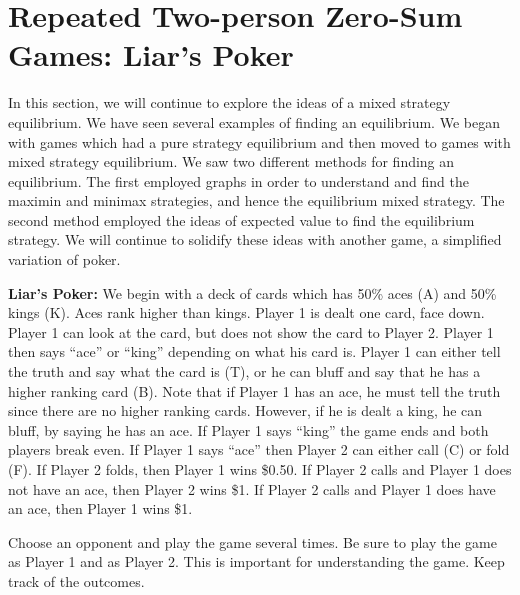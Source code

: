 

\section{Repeated Two-person Zero-Sum Games: Liar's Poker}




In this section, we will continue to explore the ideas of a mixed strategy equilibrium. We have seen several examples of finding an equilibrium. We began with games which had a pure strategy equilibrium and then moved to games with mixed strategy equilibrium. We saw two different methods for finding an equilibrium. The first employed graphs in order to understand and find the maximin and minimax strategies, and hence the equilibrium mixed strategy. The second method employed the ideas of expected value to find the equilibrium strategy. We will continue to solidify these ideas with another game, a simplified variation of poker.

\begin{example}\label{liarspoker}\textbf{Liar's Poker:}
We begin with a deck of cards which has 50\% aces (A) and 50\% kings (K). Aces rank higher than kings. Player 1 is dealt one card, face down. Player 1 can look at the card, but does not show the card to Player 2. Player 1 then says ``ace'' or ``king'' depending on what his card is. Player 1 can either tell the truth and say what the card is (T), or he can bluff and say that he has a higher ranking card (B). Note that if Player 1 has an ace, he must tell the truth since there are no higher ranking cards. However, if he is dealt a king, he can bluff, by saying he has an ace. If Player 1 says ``king'' the game ends and both players break even. If Player 1 says ``ace'' then Player 2 can either call (C) or fold (F). If Player 2 folds, then Player 1 wins \$0.50. If Player 2 calls and Player 1 does not have an ace, then Player 2 wins \$1. If Player 2 calls and Player 1 does have an ace, then Player 1 wins \$1.
\end{example}

\begin{xca}\label{E:PlayLP} 
Choose an opponent and play the game several times. Be sure to play the game as Player 1 and as Player 2. This is important for understanding the game. Keep track of the outcomes.
\end{xca}

